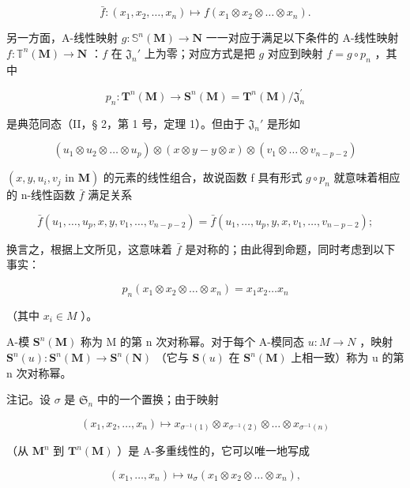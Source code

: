 \[
\bar {f} \colon (x _ {1}, x _ {2}, \dots , x _ {n}) \mapsto f (x _ {1} \otimes x _ {2} \otimes \dots \otimes x _ {n}).\tag{7}
\]

另一方面，A-线性映射 \(g \colon \mathbb{S}^n(\mathbf{M}) \to \mathbf{N}\) 一一对应于满足以下条件的 A-线性映射 \(f \colon \mathbb{T}^n(\mathbf{M}) \to \mathbf{N}\) ：\(f\) 在 \(\mathfrak{J}_n'\) 上为零；对应方式是把 \(g\) 对应到映射 \(f = g \circ p_n\) ，其中

\[
p _ {n} \colon \mathbf {T} ^ {n} (\mathbf {M}) \rightarrow \mathbf {S} ^ {n} (\mathbf {M}) = \mathbf {T} ^ {n} (\mathbf {M}) / \mathfrak {J} _ {n} ^ {\prime}
\]

是典范同态（II，§ 2，第 1 号，定理 1）。但由于 \(\mathfrak{J}_n'\) 是形如

\[
\left(u _ {1} \otimes u _ {2} \otimes \dots \otimes u _ {p}\right) \otimes (x \otimes y - y \otimes x) \otimes \left(v _ {1} \otimes \dots \otimes v _ {n - p - 2}\right)
\]

\((x, y, u_{i}, v_{j} \text{ in } \mathbf{M})\) 的元素的线性组合，故说函数 f 具有形式 \(g \circ p_{n}\) 就意味着相应的 n-线性函数 \(\bar{f}\) 满足关系

\[
\bar {f} (u _ {1}, \dots , u _ {p}, x, y, v _ {1}, \dots , v _ {n - p - 2}) = \bar {f} (u _ {1}, \dots , u _ {p}, y, x, v _ {1}, \dots , v _ {n - p - 2});
\]

换言之，根据上文所见，这意味着 \(\bar{f}\) 是对称的；由此得到命题，同时考虑到以下事实：

\[
p _ {n} (x _ {1} \otimes x _ {2} \otimes \dots \otimes x _ {n}) = x _ {1} x _ {2} \dots x _ {n}
\]

（其中 \(x_{i} \in M\) ）。

A-模 \(\mathbf{S}^{n}(\mathbf{M})\) 称为 M 的第 n 次对称幂。对于每个 A-模同态 \(u: M \to N\) ，映射 \(\mathbf{S}^{n}(u): \mathbf{S}^{n}(\mathbf{M}) \to \mathbf{S}^{n}(\mathbf{N})\) （它与 \(\mathbf{S}(u)\) 在 \(\mathbf{S}^{n}(\mathbf{M})\) 上相一致）称为 u 的第 n 次对称幂。

注记。设 \(\sigma\) 是 \(\mathfrak{S}_n\) 中的一个置换；由于映射

\[
\left(x _ {1}, x _ {2}, \dots , x _ {n}\right) \mapsto x _ {\sigma^ {- 1} (1)} \otimes x _ {\sigma^ {- 1} (2)} \otimes \dots \otimes x _ {\sigma^ {- 1} (n)}
\]

（从 \(\mathbf{M}^n\) 到 \(\mathbf{T}^n (\mathbf{M})\) ）是 A-多重线性的，它可以唯一地写成

\[
(x _ {1}, \dots , x _ {n}) \mapsto u _ {\sigma} (x _ {1} \otimes x _ {2} \otimes \dots \otimes x _ {n}),
\]

